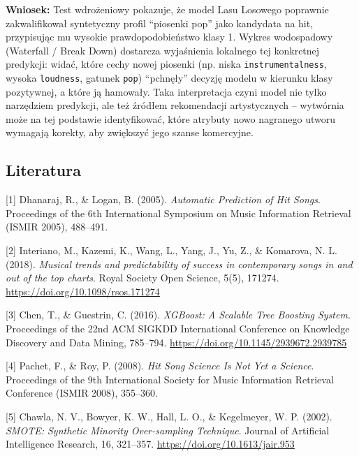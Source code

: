 \documentclass[
]{article}
\begin{document}
\textbf{Wniosek:} Test wdrożeniowy pokazuje, że model Lasu Losowego
poprawnie zakwalifikował syntetyczny profil ``piosenki pop'' jako
kandydata na hit, przypisując mu wysokie prawdopodobieństwo klasy 1.
Wykres wodospadowy (Waterfall / Break Down) dostarcza wyjaśnienia
lokalnego tej konkretnej predykcji: widać, które cechy nowej piosenki
(np. niska \texttt{instrumentalness}, wysoka \texttt{loudness}, gatunek
\texttt{pop}) ``pchnęły'' decyzję modelu w kierunku klasy pozytywnej, a
które ją hamowały. Taka interpretacja czyni model nie tylko narzędziem
predykcji, ale też źródłem rekomendacji artystycznych -- wytwórnia może
na tej podstawie identyfikować, które atrybuty nowo nagranego utworu
wymagają korekty, aby zwiększyć jego szanse komercyjne.

\subsection{Literatura}\label{literatura}

{[}1{]} Dhanaraj, R., \& Logan, B. (2005). \emph{Automatic Prediction of
Hit Songs}. Proceedings of the 6th International Symposium on Music
Information Retrieval (ISMIR 2005), 488--491.

{[}2{]} Interiano, M., Kazemi, K., Wang, L., Yang, J., Yu, Z., \&
Komarova, N. L. (2018). \emph{Musical trends and predictability of
success in contemporary songs in and out of the top charts}. Royal
Society Open Science, 5(5), 171274.
\url{https://doi.org/10.1098/rsos.171274}

{[}3{]} Chen, T., \& Guestrin, C. (2016). \emph{XGBoost: A Scalable Tree
Boosting System}. Proceedings of the 22nd ACM SIGKDD International
Conference on Knowledge Discovery and Data Mining, 785--794.
\url{https://doi.org/10.1145/2939672.2939785}

{[}4{]} Pachet, F., \& Roy, P. (2008). \emph{Hit Song Science Is Not Yet
a Science}. Proceedings of the 9th International Society for Music
Information Retrieval Conference (ISMIR 2008), 355--360.

{[}5{]} Chawla, N. V., Bowyer, K. W., Hall, L. O., \& Kegelmeyer, W. P.
(2002). \emph{SMOTE: Synthetic Minority Over-sampling Technique}.
Journal of Artificial Intelligence Research, 16, 321--357.
\url{https://doi.org/10.1613/jair.953}
\end{document}
